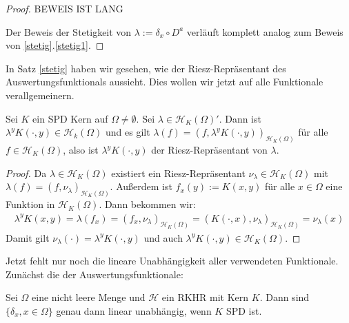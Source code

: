 \begin{proof}
BEWEIS IST LANG

Der Beweis der Stetigkeit von $\lambda := \delta_x \circ D^a$ verläuft komplett analog zum Beweis von \ref{stetig}.\ref{stetig1}.
\end{proof}

In Satz \ref{stetig} haben wir gesehen, wie der Riesz-Repräsentant des Auswertungsfunktionals aussieht. Dies wollen wir jetzt auf alle Funktionale verallgemeinern.

\begin{theorem}
\label{Riesz}
Sei $K$ ein \ac{SPD} Kern auf $\Omega \neq \emptyset$. Sei $\lambda \in \mathcal{H}_K (\Omega)'$. Dann ist $\lambda^y K(\cdot,y) \in \mathcal{H}_k(\Omega)$ und es gilt $\lambda(f) = \left(f,\lambda^y K(\cdot,y)\right)_{\mathcal{H}_K(\Omega)}$ für alle $f \in \mathcal{H}_K(\Omega)$, also ist $\lambda^y K(\cdot,y)$ der Riesz-Repräsentant von $\lambda$.
\end{theorem}

\begin{proof}
Da $\lambda \in \mathcal{H}_K(\Omega)$ existiert ein Riesz-Repräsentant $\nu_\lambda \in \mathcal{H}_K(\Omega)$ mit $\lambda (f) = \left(f, \nu_\lambda\right)_{\mathcal{H}_K(\Omega)}$. Außerdem ist $f_x(y) := K(x,y)$ für alle $x \in \Omega$ eine Funktion in $\mathcal{H}_K (\Omega)$. Dann bekommen wir:
\begin{align*}
\lambda^y K(x,y) = \lambda(f_x) = \left(f_x, \nu_\lambda\right)_{\mathcal{H}_K (\Omega)} = \left(K(\cdot,x), \nu_\lambda\right)_{\mathcal{H}_K (\Omega)} = \nu_\lambda(x)
\end{align*}
Damit gilt $\nu_\lambda(\cdot) = \lambda^y K(\cdot,y)$ und auch $\lambda^y K(\cdot,y) \in \mathcal{H}_K (\Omega)$.
\end{proof}

Jetzt fehlt nur noch die lineare Unabhängigkeit aller verwendeten Funktionale. Zunächst die der Auswertungsfunktionale:
\begin{theorem}
Sei $\Omega$ eine nicht leere Menge und $\mathcal{H}$ ein \ac{RKHR} mit Kern $K$. Dann sind $\{\delta_x,x\in \Omega\}$ genau dann linear unabhängig, wenn $K$ \ac{SPD} ist.
\end{theorem}

